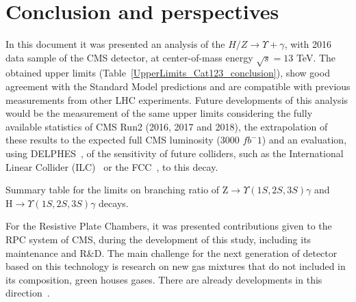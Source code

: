 \chapter{Conclusion and perspectives}
\label{chapter_conclusion_and_perspectives}

In this document it was presented an analysis of the $H/Z \rightarrow \Upsilon + \gamma$, with 2016 data sample of the CMS detector, at center-of-mass energy $\sqrt{s}=13$ TeV. The obtained upper limits (Table~\ref{UpperLimits_Cat123_conclusion}), show good agreement with the Standard Model predictions and are compatible with previous measurements from other LHC experiments. Future developments of this analysis would be the measurement of the same upper limits considering the fully available statistics of CMS Run2 (2016, 2017 and 2018), the extrapolation of these results to the expected full CMS luminosity (3000 $fb^-1$) and an evaluation, using DELPHES~\cite{delphes},  of the sensitivity of future colliders, such as the International Linear Collider (ILC)~\cite{ilc} or the FCC~\cite{fcc}, to this decay.

\begin{table}[ht]
    \begin{center}
    \caption{Summary table for the limits on branching ratio of $\mathrm{Z}\to\Upsilon(1S,2S,3S)\gamma$ and $\mathrm{H}\to\Upsilon(1S,2S,3S)\gamma$ decays.}
    
    \label{tab:UpperLimits_Cat123_conclusion}
    \end{center}
\end{table}

For the Resistive Plate Chambers, it was presented contributions given to the RPC system of CMS, during the development of this study, including its maintenance and R\&D. The main challenge for the next generation of detector based on this technology is research on new gas mixtures that do not included in its composition, green houses gases. There are already developments in this direction~\cite{eco_gas}. 
